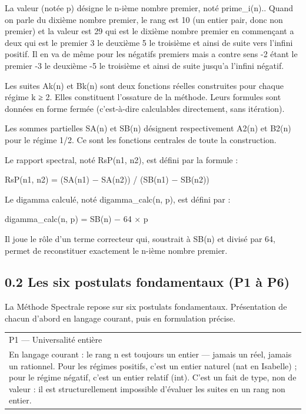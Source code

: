 \documentclass[11pt,a4paper]{article}
\begin{document}
La valeur (notée p) désigne le n-ième nombre premier, noté prime\_i(n).. Quand on parle du dixième nombre premier, le rang est 10 (un entier pair, donc non premier) et la valeur est 29 qui est le dixième nombre premier en commençant a deux qui est le premier 3 le deuxième 5 le troisième et ainsi de suite vers l'infini positif. Il en va de même pour les négatifs premiers mais a contre sens -2 étant le premier -3 le deuxième -5 le troisième et ainsi de suite jusqu'a l'infini négatif.

Les suites Ak(n) et Bk(n) sont deux fonctions réelles construites pour chaque régime k ≥ 2. Elles constituent l'ossature de la méthode. Leurs formules sont données en forme fermée (c'est-à-dire calculables directement, sans itération).

Les sommes partielles SA(n) et SB(n) désignent respectivement A2(n) et B2(n) pour le régime 1/2. Ce sont les fonctions centrales de toute la construction.

Le rapport spectral, noté RsP(n1, n2), est défini par la formule :

RsP(n1, n2) = (SA(n1) − SA(n2)) / (SB(n1) − SB(n2))

Le digamma calculé, noté digamma\_calc(n, p), est défini par :

digamma\_calc(n, p) = SB(n) − 64 × p

Il joue le rôle d'un terme correcteur qui, soustrait à SB(n) et divisé par 64, permet de reconstituer exactement le n-ième nombre premier.

\subsection{0.2 Les six postulats fondamentaux (P1 à P6)}

La Méthode Spectrale repose sur six postulats fondamentaux. Présentation de chacun d'abord en langage courant, puis en formulation précise.


\begin{longtable}{|p{}|}
\hline
P1 — Universalité entière \\ En langage courant : le rang n est toujours un entier — jamais un réel, jamais un rationnel. Pour les régimes positifs, c'est un entier naturel (nat en Isabelle) ; pour le régime négatif, c'est un entier relatif (int). C'est un fait de type, non de valeur : il est structurellement impossible d'évaluer les suites en un rang non entier. \\
\hline
\end{longtable}
\end{document}
